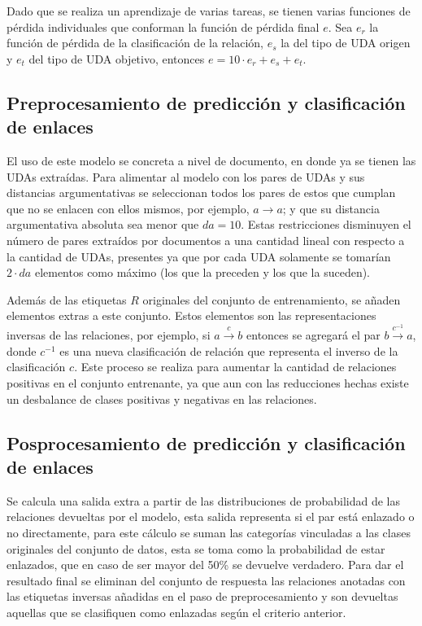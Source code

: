 Dado que se realiza un aprendizaje de varias tareas, se tienen varias funciones de pérdida individuales que conforman 
la función de pérdida final $e$. Sea $e_r$ la función de pérdida de la clasificación de la relación, $e_s$ la del tipo de UDA origen  
y $e_t$ del tipo de UDA objetivo, entonces $e = 10 \cdot e_r + e_s + e_t$.

\subsection{Preprocesamiento de predicción y clasificación de enlaces}

El uso de este modelo se concreta a nivel de documento, en donde ya se tienen las UDAs extraídas. Para alimentar
al modelo con los pares de UDAs y sus distancias argumentativas se seleccionan todos los pares de estos que cumplan
que no se enlacen con ellos mismos, por ejemplo, $a \rightarrow a$; y que su distancia argumentativa absoluta sea menor 
que $da=10$. Estas restricciones disminuyen el número de pares extraídos por documentos a una cantidad lineal 
con respecto a la cantidad de UDAs, presentes ya que por cada UDA solamente se tomarían $2 \cdot da$ elementos como máximo
(los que la preceden y los que la suceden). 

Además de las etiquetas $R$ originales del conjunto de entrenamiento, se añaden elementos extras a este
conjunto. Estos elementos son las representaciones inversas de las relaciones, por ejemplo, si $a \xrightarrow{c} b$ entonces 
se agregará el par $b \xrightarrow{c^{-1}} a$, donde $c^{-1}$ es una nueva clasificación de relación que representa
el inverso de la clasificación $c$. Este proceso se realiza para aumentar la cantidad de relaciones positivas en el
conjunto entrenante, ya que aun con las reducciones hechas existe un desbalance de clases positivas y negativas en
las relaciones.

\subsection{Posprocesamiento de predicción y clasificación de enlaces}

Se calcula una salida extra a partir de las distribuciones de probabilidad de las relaciones 
devueltas por el modelo, esta salida representa si el par está enlazado o no directamente, para este cálculo se 
suman las categorías vinculadas a las clases originales del conjunto de datos, esta se toma como la probabilidad de estar 
enlazados, que en caso de ser mayor del 50\% se devuelve verdadero. Para dar el resultado final se eliminan del 
conjunto de respuesta las relaciones anotadas con las etiquetas inversas añadidas en el paso de preprocesamiento 
y son devueltas aquellas que se clasifiquen como enlazadas según el criterio anterior.

